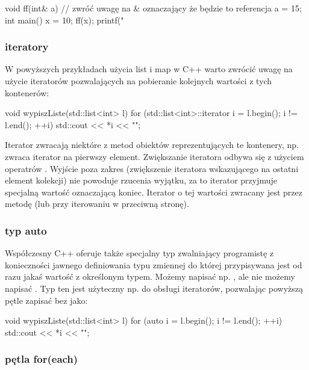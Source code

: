 \documentclass{pdfBooklets}
\begin{document}
\begin{CodeFrame*}[c]{}
void ff(int& a) { // zwróć uwagę na & oznaczający że będzie to referencja
    a = 15;
}
int main() {
    x = 10;
    ff(x);
    printf("%
}
\end{CodeFrame*}

\subsubsection{iteratory}

W powyższych przykładach użycia list i map w C++ warto zwrócić uwagę na użycie iteratorów pozwalających na pobieranie kolejnych wartości z tych kontenerów:

\begin{CodeFrame*}[cpp]{}
void wypiszListe(std::list<int> l) {
    for (std::list<int>::iterator i = l.begin(); i != l.end(); ++i) {
        std::cout << *i << "\n";
    }
}
\end{CodeFrame*}

Iterator zwracają niektóre z metod obiektów reprezentujących te kontenery, np.  zwraca iterator na pierwszy element.
Zwiększanie iteratora odbywa się z użyciem operatrów \cpp{++}.
Wyjście poza zakres (zwiększenie iteratora wskazującego na ostatni element kolekcji) nie powoduje rzucenia wyjątku, za to iterator przyjmuje specjalną wartość oznaczającą koniec.
Iterator o tej wartości zwracany jest przez metodę  (lub  przy iterowaniu w przeciwną stronę).

\subsubsection{typ auto}

Współczesny C++ oferuje także specjalny typ  zwalniający programistę z konieczności jawnego definiowania typu zmiennej do której przypisywana jest od razu jakaś wartość z określonym typem. Możemy napisać np. , ale nie możemy napisać . Typ ten jest użyteczny np. do obsługi iteratorów, pozwalając powyższą pętle zapisać bez  jako:

\begin{CodeFrame*}[cpp]{}
void wypiszListe(std::list<int> l) {
    for (auto i = l.begin(); i != l.end(); ++i) {
        std::cout << *i << "\n";
    }
}
\end{CodeFrame*}

\subsubsection{pętla for(each)}
\end{document}
